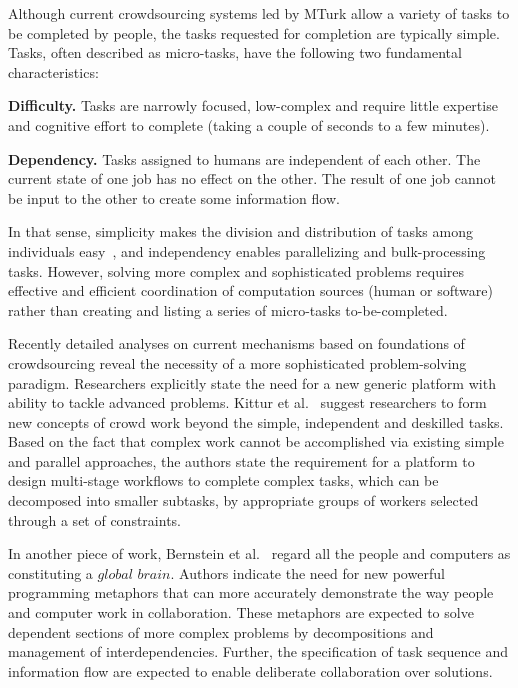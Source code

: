 Although current crowdsourcing systems led by MTurk allow a variety of tasks 
to be completed by people, the tasks requested for completion are typically simple. 
Tasks, often described as micro-tasks, have the following two fundamental characteristics:

\textbf{Difficulty.} Tasks are narrowly focused, low-complex and require 
little expertise and cognitive effort to complete (taking a couple of seconds to 
a few minutes).

\textbf{Dependency.} Tasks assigned to humans are independent of each other. 
The current state of one job has no effect on the other. The result of one job cannot 
be input to the other to create some information flow.

In that sense, simplicity makes the division and distribution of tasks among 
individuals easy~\cite{Zhang2011}, and independency enables parallelizing 
and bulk-processing tasks. However, solving more complex and sophisticated 
problems requires effective and efficient coordination of computation sources 
(human or software) rather than creating and listing a series of micro-tasks 
to-be-completed.

Recently detailed analyses on current mechanisms based on foundations of 
crowdsourcing reveal the necessity of a more sophisticated problem-solving 
paradigm. Researchers explicitly state the need for a new generic platform 
with ability to tackle advanced problems. Kittur et al.~\cite{Kittur2013} 
suggest researchers to form new concepts of crowd work beyond 
the simple, independent and deskilled tasks. Based on the fact that complex 
work cannot be accomplished via existing simple and parallel approaches,
the authors state the requirement for a platform to design multi-stage workflows 
to complete complex tasks, which can be decomposed into smaller subtasks, 
by appropriate groups of workers selected through a set of constraints.

In another piece of work, Bernstein et al.~\cite{Bernstein2012} regard all the 
people and computers as constituting a $global$ $brain$. Authors indicate the 
need for new powerful programming metaphors that can more accurately 
demonstrate the way people and computer work in collaboration. These 
metaphors are expected to solve dependent sections of more complex problems by 
decompositions and management of interdependencies. Further, the specification 
of task sequence and information flow are expected to enable deliberate 
collaboration over solutions.

